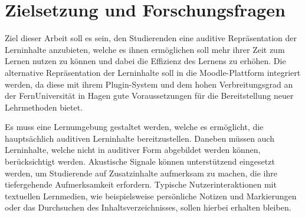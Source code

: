 %
%
%


\section{Zielsetzung und Forschungsfragen}
\label{sec:zielsetzung}
Ziel dieser Arbeit soll es sein, den Studierenden eine auditive Repräsentation der Lerninhalte anzubieten, welche es ihnen ermöglichen soll mehr ihrer Zeit zum Lernen nutzen zu können und dabei die Effizienz des Lernens zu erhöhen. Die alternative Repräsentation der Lerninhalte soll in die Moodle-Plattform integriert werden, da diese mit ihrem Plugin-System und dem hohen Verbreitungsgrad an der FernUniversität in Hagen gute Voraussetzungen für die Bereitstellung neuer Lehrmethoden bietet. %

Es muss eine Lernumgebung gestaltet werden, welche es ermöglicht, die hauptsächlich auditiven Lerninhalte bereitzustellen. Daneben müssen auch Lerninhalte, welche nicht in auditiver Form abgebildet werden können, berücksichtigt werden. Akustische Signale können unterstützend eingesetzt werden, um Studierende auf Zusatzinhalte aufmerksam zu machen, die ihre tiefergehende Aufmerksamkeit erfordern. Typische Nutzerinteraktionen mit textuellen Lernmedien, wie beispielsweise persönliche Notizen und Markierungen oder das Durchsuchen des Inhaltsverzeichnisses, sollen hierbei erhalten bleiben.

